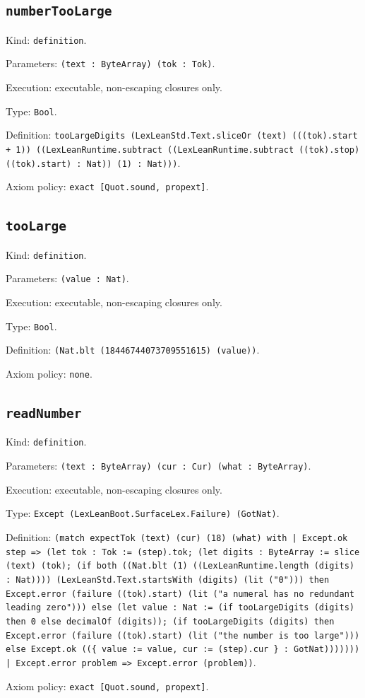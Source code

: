 \documentclass[11pt]{article}
\begin{document}
\subsection*{\texttt{numberTooLarge}}
\noindent Kind: \texttt{definition}.\par
\noindent Parameters: \texttt{(text : ByteArray) (tok : Tok)}.\par
\noindent Execution: executable, non-escaping closures only.\par
\noindent Type: \texttt{Bool}.\par
\noindent Definition: \texttt{tooLargeDigits (LexLeanStd.Text.sliceOr (text) (((tok).start + 1)) ((LexLeanRuntime.subtract ((LexLeanRuntime.subtract ((tok).stop) ((tok).start) : Nat)) (1) : Nat)))}.\par
\noindent Axiom policy: \texttt{exact [Quot.sound, propext]}.\par
\subsection*{\texttt{tooLarge}}
\noindent Kind: \texttt{definition}.\par
\noindent Parameters: \texttt{(value : Nat)}.\par
\noindent Execution: executable, non-escaping closures only.\par
\noindent Type: \texttt{Bool}.\par
\noindent Definition: \texttt{(Nat.blt (18446744073709551615) (value))}.\par
\noindent Axiom policy: \texttt{none}.\par
\subsection*{\texttt{readNumber}}
\noindent Kind: \texttt{definition}.\par
\noindent Parameters: \texttt{(text : ByteArray) (cur : Cur) (what : ByteArray)}.\par
\noindent Execution: executable, non-escaping closures only.\par
\noindent Type: \texttt{Except (LexLeanBoot.SurfaceLex.Failure) (GotNat)}.\par
\noindent Definition: \texttt{(match expectTok (text) (cur) (18) (what) with | Except.ok step => (let tok : Tok := (step).tok; (let digits : ByteArray := slice (text) (tok); (if both ((Nat.blt (1) ((LexLeanRuntime.length (digits) : Nat)))) (LexLeanStd.Text.startsWith (digits) (lit ("0"))) then Except.error (failure ((tok).start) (lit ("a numeral has no redundant leading zero"))) else (let value : Nat := (if tooLargeDigits (digits) then 0 else decimalOf (digits)); (if tooLargeDigits (digits) then Except.error (failure ((tok).start) (lit ("the number is too large"))) else Except.ok ((\{ value := value, cur := (step).cur \} : GotNat))))))) | Except.error problem => Except.error (problem))}.\par
\noindent Axiom policy: \texttt{exact [Quot.sound, propext]}.\par
\end{document}
